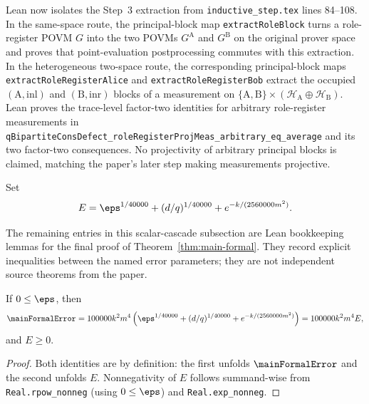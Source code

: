 \begin{remark}\label{rem:main-formal-unsymmetrization-consistency}
	Lean now isolates the Step~3 extraction from \texttt{inductive\_step.tex}
	lines 84--108.  In the same-space route, the principal-block map
	\texttt{extractRoleBlock} turns a role-register POVM \(G\) into the two POVMs
	\(G^{\mathrm A}\) and \(G^{\mathrm B}\) on the original prover space and
	proves that point-evaluation postprocessing commutes with this extraction.
	In the heterogeneous two-space route, the corresponding principal-block maps
	\texttt{extractRoleRegisterAlice} and \texttt{extractRoleRegisterBob}
	extract the occupied \((\mathrm A,\mathrm{inl})\) and
	\((\mathrm B,\mathrm{inr})\) blocks of a measurement on
	\(\{\mathrm A,\mathrm B\}\times(\mathcal H_{\mathrm A}\oplus\mathcal H_{\mathrm B})\).
	Lean proves the trace-level factor-two identities for arbitrary
	role-register measurements in
	\texttt{qBipartiteConsDefect\_roleRegisterProjMeas\_arbitrary\_eq\_average}
	and its two factor-two consequences.  No projectivity of arbitrary principal
	blocks is claimed, matching the paper's later step making measurements
	projective.
\end{remark}

\begin{definition}\label{def:main-formal-envelope}
	\leanok
	Set
	\[
		E = \eps^{1/40000} + (d/q)^{1/40000} + e^{-k/(2560000m^2)}.
	\]
\end{definition}

The remaining entries in this scalar-cascade subsection are Lean bookkeeping
lemmas for the final proof of Theorem~\ref{thm:main-formal}.  They record
explicit inequalities between the named error parameters; they are not
independent source theorems from the paper.

\begin{theorem}\label{thm:main-formal-envelope-basics}
	\leanok
	If $0 \le \eps$, then
	\[
		\mainFormalError
		= 100000k^2m^4\left(\eps^{1/40000} + (d/q)^{1/40000} + e^{-k/(2560000m^2)}\right)
		= 100000k^2m^4 E,
	\]
	and $E \ge 0$.
\end{theorem}
\begin{proof}
	\leanok
	Both identities are by definition: the first unfolds $\mainFormalError$ and the second unfolds $E$. Nonnegativity of $E$ follows summand-wise from \texttt{Real.rpow\_nonneg} (using $0 \le \eps$) and \texttt{Real.exp\_nonneg}.
\end{proof}

